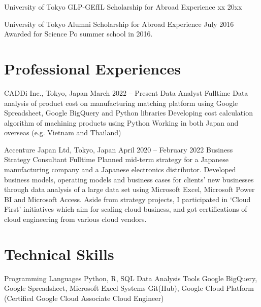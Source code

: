 \documentclass{article}
\begin{document}
University of Tokyo GLP-GEfIL Scholarship for Abroad Experience           xx 20xx

University of Tokyo Alumni Scholarship for Abroad Experience           July 2016
Awarded for Science Po summer school in 2016.


\section{Professional Experiences}
CADDi Inc., Tokyo, Japan                                                      March 2022 –  Present
Data Analyst
Fulltime
Data analysis of product cost on manufacturing matching platform using Google Spreadsheet, Google BigQuery and Python libraries
Developing cost calculation algorithm of machining products using Python
Working in both Japan and overseas (e.g. Vietnam and Thailand)

Accenture Japan Ltd, Tokyo, Japan                            April 2020 –  February 2022
Business Strategy Consultant
Fulltime
Planned mid-term strategy for a Japanese manufacturing company and a Japanese electronics distributor.
Developed business models, operating models and business cases for clients' new businesses through data analysis of a large data set using Microsoft Excel, Microsoft Power BI and Microsoft Access.
Aside from strategy projects, I participated in  ‘Cloud First’ initiatives which aim for scaling cloud business, and got certifications of cloud engineering from various cloud vendors.

\section{Technical Skills}
Programming Languages Python, R, SQL
Data Analysis Tools Google BigQuery, Google Spreadsheet, Microsoft Excel
Systems Git(Hub), Google Cloud Platform (Certified Google Cloud Associate Cloud Engineer)
\end{document}
